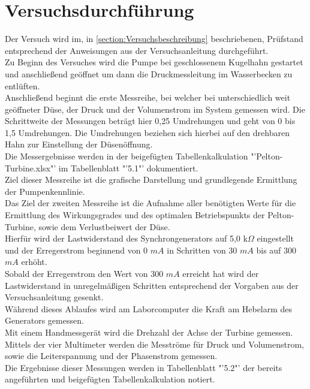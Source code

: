 \section{Versuchsdurchführung}
Der Versuch wird im, in \autoref{section:Versuchsbeschreibung} beschriebenen, Prüfstand entsprechend der Anweisungen aus der Versuchsanleitung \cite[S.11-14]{Anleitung} durchgeführt.\\
Zu Beginn des Versuches wird die Pumpe bei geschlossenem Kugelhahn gestartet und anschließend geöffnet um dann die Druckmessleitung im Wasserbecken zu entlüften.\\
Anschließend beginnt die erste Messreihe, bei welcher bei unterschiedlich weit geöffneter Düse, der Druck und der Volumenstrom im System gemessen wird.
Die Schrittweite der Messungen beträgt hier 0,25 Umdrehungen und geht von 0 bis 1,5 Umdrehungen. Die Umdrehungen beziehen sich hierbei auf den drehbaren Hahn zur Einstellung der Düsenöffnung.\\
Die Messergebnisse werden in der beigefügten Tabellenkalkulation "'Pelton-Turbine.xlsx"' im Tabellenblatt "'5.1"' dokumentiert.\\
Ziel dieser Messreihe ist die grafische Darstellung und grundlegende Ermittlung der Pumpenkennlinie.\\
\newline
Das Ziel der zweiten Messreihe ist die Aufnahme aller benötigten Werte für die Ermittlung des Wirkungsgrades und des optimalen Betriebspunkts der Pelton-Turbine,
 sowie dem Verlustbeiwert der Düse.\\
 Hierfür wird der Lastwiderstand des Synchrongenerators auf 5,0 k$\Omega$ eingestellt und der Erregerstrom beginnend von 0 $mA$ in Schritten von 30 $mA$ bis auf 300 $mA$ erhöht.\\
 Sobald der Erregerstrom den Wert von 300 $mA$ erreicht hat wird der Lastwiderstand in unregelmäßigen Schritten entsprechend der Vorgaben aus der Versuchsanleitung \cite[S.12]{Anleitung} gesenkt.\\
 Während dieses Ablaufes wird am Laborcomputer die Kraft am Hebelarm des Generators gemessen.\\
 Mit einem Handmessgerät wird die Drehzahl der Achse der Turbine gemessen.\\
 Mittels der vier Multimeter werden die Mesströme für Druck und Volumenstrom, sowie die Leiterspannung und der Phasenstrom gemessen.\\
 Die Ergebnisse dieser Messungen werden in Tabellenblatt "'5.2"' der bereits angeführten und beigefügten Tabellenkalkulation notiert.\\
